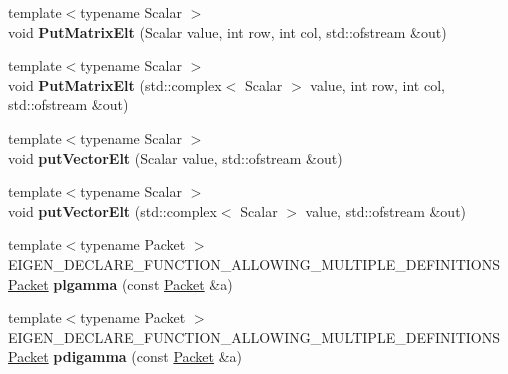 \begin{DoxyCompactItemize}
\mbox{\label{namespace_eigen_1_1internal_ab51b65f073e663c1728400cbee6d198f}} 
{\footnotesize template$<$typename Scalar $>$ }\\void {\bfseries Put\+Matrix\+Elt} (Scalar value, int row, int col, std\+::ofstream \&out)
\item 
\mbox{\label{namespace_eigen_1_1internal_a27151df12e7a9a6e106e2078dda79683}} 
{\footnotesize template$<$typename Scalar $>$ }\\void {\bfseries Put\+Matrix\+Elt} (std\+::complex$<$ Scalar $>$ value, int row, int col, std\+::ofstream \&out)
\item 
\mbox{\label{namespace_eigen_1_1internal_ae2c2feff7d83462d5ddeb10ba4360ecb}} 
{\footnotesize template$<$typename Scalar $>$ }\\void {\bfseries put\+Vector\+Elt} (Scalar value, std\+::ofstream \&out)
\item 
\mbox{\label{namespace_eigen_1_1internal_af8aa46d8901e6b53e28d933d4cf5cf7d}} 
{\footnotesize template$<$typename Scalar $>$ }\\void {\bfseries put\+Vector\+Elt} (std\+::complex$<$ Scalar $>$ value, std\+::ofstream \&out)
\item 
\mbox{\label{namespace_eigen_1_1internal_a8d0df69be42787700e73a6ca8a5d4176}} 
{\footnotesize template$<$typename Packet $>$ }\\E\+I\+G\+E\+N\+\_\+\+D\+E\+C\+L\+A\+R\+E\+\_\+\+F\+U\+N\+C\+T\+I\+O\+N\+\_\+\+A\+L\+L\+O\+W\+I\+N\+G\+\_\+\+M\+U\+L\+T\+I\+P\+L\+E\+\_\+\+D\+E\+F\+I\+N\+I\+T\+I\+O\+NS \hyperlink{union_eigen_1_1internal_1_1_packet}{Packet} {\bfseries plgamma} (const \hyperlink{union_eigen_1_1internal_1_1_packet}{Packet} \&a)
\item 
\mbox{\label{namespace_eigen_1_1internal_a0fd632b9da5250a94cd62061383a7efe}} 
{\footnotesize template$<$typename Packet $>$ }\\E\+I\+G\+E\+N\+\_\+\+D\+E\+C\+L\+A\+R\+E\+\_\+\+F\+U\+N\+C\+T\+I\+O\+N\+\_\+\+A\+L\+L\+O\+W\+I\+N\+G\+\_\+\+M\+U\+L\+T\+I\+P\+L\+E\+\_\+\+D\+E\+F\+I\+N\+I\+T\+I\+O\+NS \hyperlink{union_eigen_1_1internal_1_1_packet}{Packet} {\bfseries pdigamma} (const \hyperlink{union_eigen_1_1internal_1_1_packet}{Packet} \&a)

\end{DoxyCompactItemize}
